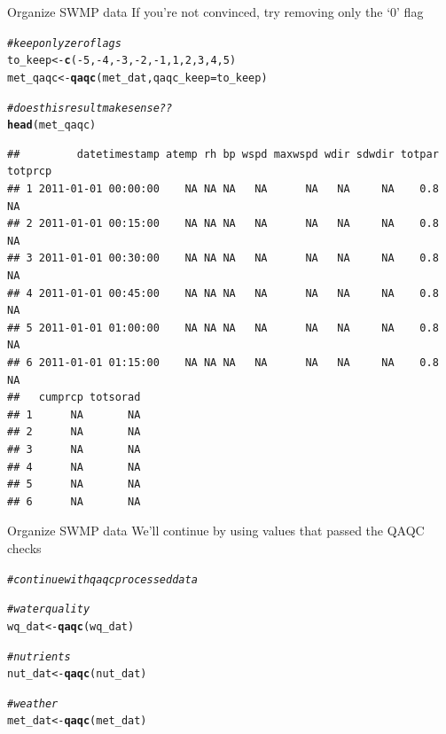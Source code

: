 \documentclass[xcolor=svgnames]{beamer}\usepackage[]{graphicx}\usepackage[]{color}
\makeatletter
\newcommand{\hlnum}[1]{\textcolor[rgb]{0.686,0.059,0.569}{#1}}%
\newcommand{\hlcom}[1]{\textcolor[rgb]{0.678,0.584,0.686}{\textit{#1}}}%
\newcommand{\hlopt}[1]{\textcolor[rgb]{0,0,0}{#1}}%
\newcommand{\hlstd}[1]{\textcolor[rgb]{0.345,0.345,0.345}{#1}}%
\newcommand{\hlkwb}[1]{\textcolor[rgb]{0.69,0.353,0.396}{#1}}%
\newcommand{\hlkwc}[1]{\textcolor[rgb]{0.333,0.667,0.333}{#1}}%
\newcommand{\hlkwd}[1]{\textcolor[rgb]{0.737,0.353,0.396}{\textbf{#1}}}%
\newenvironment{kframe}{%
 \def\at@end@of@kframe{}%
 \ifinner\ifhmode%
  \def\at@end@of@kframe{\end{minipage}}%
  \begin{minipage}{\columnwidth}%
 \fi\fi%
 \def\FrameCommand##1{\hskip\@totalleftmargin \hskip-\fboxsep
 \colorbox{shadecolor}{##1}\hskip-\fboxsep
     \hskip-\linewidth \hskip-\@totalleftmargin \hskip\columnwidth}%
 \MakeFramed {\advance\hsize-\width
   \@totalleftmargin\z@ \linewidth\hsize
   \@setminipage}}%
 {\par\unskip\endMakeFramed%
 \at@end@of@kframe}
\newenvironment{knitrout}{}{} %
\makeatother
\begin{document}
\begin{frame}[containsverbatim]{Organize SWMP data}
If you're not convinced, try removing only the `0' flag
\begin{knitrout}\scriptsize
{}\color{fgcolor}\begin{kframe}
\begin{alltt}
\hlcom{# keep only zero flags}
\hlstd{to_keep} \hlkwb{<-} \hlkwd{c}\hlstd{(}\hlopt{-}\hlnum{5}\hlstd{,} \hlopt{-}\hlnum{4}\hlstd{,} \hlopt{-}\hlnum{3}\hlstd{,} \hlopt{-}\hlnum{2}\hlstd{,} \hlopt{-}\hlnum{1}\hlstd{,} \hlnum{1}\hlstd{,} \hlnum{2}\hlstd{,} \hlnum{3}\hlstd{,} \hlnum{4}\hlstd{,} \hlnum{5}\hlstd{)}
\hlstd{met_qaqc} \hlkwb{<-} \hlkwd{qaqc}\hlstd{(met_dat,} \hlkwc{qaqc_keep} \hlstd{= to_keep)}

\hlcom{# does this result make sense??}
\hlkwd{head}\hlstd{(met_qaqc)}
\end{alltt}
\begin{verbatim}
##         datetimestamp atemp rh bp wspd maxwspd wdir sdwdir totpar totprcp
## 1 2011-01-01 00:00:00    NA NA NA   NA      NA   NA     NA    0.8      NA
## 2 2011-01-01 00:15:00    NA NA NA   NA      NA   NA     NA    0.8      NA
## 3 2011-01-01 00:30:00    NA NA NA   NA      NA   NA     NA    0.8      NA
## 4 2011-01-01 00:45:00    NA NA NA   NA      NA   NA     NA    0.8      NA
## 5 2011-01-01 01:00:00    NA NA NA   NA      NA   NA     NA    0.8      NA
## 6 2011-01-01 01:15:00    NA NA NA   NA      NA   NA     NA    0.8      NA
##   cumprcp totsorad
## 1      NA       NA
## 2      NA       NA
## 3      NA       NA
## 4      NA       NA
## 5      NA       NA
## 6      NA       NA
\end{verbatim}
\end{kframe}
\end{knitrout}
\end{frame}

\begin{frame}[containsverbatim]{Organize SWMP data}
We'll continue by using values that passed the QAQC checks
\begin{knitrout}\scriptsize
{}\color{fgcolor}\begin{kframe}
\begin{alltt}
\hlcom{# continue with qaqc processed data}

\hlcom{# water quality}
\hlstd{wq_dat} \hlkwb{<-} \hlkwd{qaqc}\hlstd{(wq_dat)}

\hlcom{# nutrients}
\hlstd{nut_dat} \hlkwb{<-} \hlkwd{qaqc}\hlstd{(nut_dat)}

\hlcom{# weather}
\hlstd{met_dat} \hlkwb{<-} \hlkwd{qaqc}\hlstd{(met_dat)}
\end{alltt}
\end{kframe}
\end{knitrout}
\end{frame}
\end{document}
